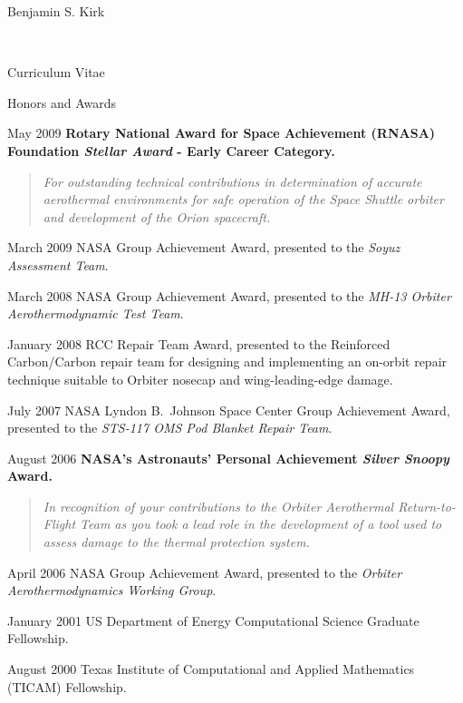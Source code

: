 \documentclass[10pt]{report}
\begin{document}
\begin{cv}{\centerline{\Large Benjamin S. Kirk}\\
    \centerline{\large Curriculum Vitae}}
\begin{cvlist}{Honors and Awards}
    \item[May 2009]
      \textbf{Rotary National Award for Space Achievement (RNASA) Foundation {\em Stellar Award} - Early Career Category.}
      \begin{quote}
        \em For outstanding technical contributions in determination of accurate aerothermal environments for safe operation of the Space Shuttle orbiter and development of the Orion spacecraft.
      \end{quote}
        

    \item[March 2009]
    NASA Group Achievement Award, presented to the {\em Soyuz Assessment Team}.
    
    \item[March 2008]
    NASA Group Achievement Award, presented to the {\em MH-13 Orbiter Aerothermodynamic Test Team}.

    \item[January 2008]
     RCC Repair Team Award, presented to the Reinforced Carbon/Carbon repair team for designing and implementing an on-orbit repair technique suitable to Orbiter nosecap and wing-leading-edge damage.

    \item[July 2007]
      NASA Lyndon B.~Johnson Space Center Group Achievement Award, presented to the {\em STS-117 OMS Pod Blanket Repair Team}.

    \item[August 2006]
      \textbf{NASA's Astronauts' Personal Achievement {\em Silver Snoopy} Award.}

      \begin{quote}
        \em In recognition of your contributions to the Orbiter Aerothermal Return-to-Flight Team as you took a lead role in the development of a tool used to assess damage to the thermal protection system.
      \end{quote}
      
    \item[April 2006]
      NASA Group Achievement Award, presented to the {\em Orbiter Aerothermodynamics Working Group}.
      
    \item[January 2001]
      US Department of Energy Computational Science Graduate Fellowship.
      
    \item[August 2000]
      Texas Institute of Computational and Applied Mathematics (TICAM) Fellowship.
      

\end{cvlist}
\end{cv}
\end{document}

